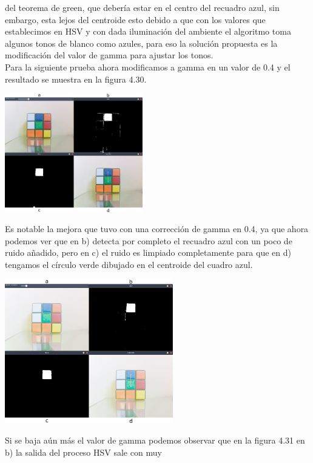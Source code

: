 del teorema de green, que debería estar en el centro del recuadro azul, sin embargo, esta lejos del centroide esto debido a que con
los valores que establecimos en HSV y con dada iluminación del ambiente el algoritmo toma algunos tonos de blanco como azules,
para eso la solución propuesta es la modificación del valor de gamma para ajustar los tonos.\\
Para la siguiente prueba ahora modificamos a gamma en un valor de 0.4 y el resultado se muestra en la figura 4.30.
\begin{center}
	\includegraphics[width=0.45\textwidth]{Contenido/Cuerpo/Capitulo4/Fig26.eps}
	\label{Fig9}
\end{center}
Es notable la mejora que tuvo con una corrección de gamma en 0.4, ya que ahora podemos ver que en b) detecta por completo el
recuadro azul con un poco de ruido añadido, pero en c) el ruido es limpiado completamente para que en d) tengamos el círculo verde
dibujado en el centroide del cuadro azul.
\begin{center}
	\includegraphics[width=0.55\textwidth]{Contenido/Cuerpo/Capitulo4/Fig27.eps}
	\label{Fig9}
\end{center}
Si se baja aún más el valor de gamma podemos observar que en la figura 4.31 en b) la salida del proceso HSV sale con muy
